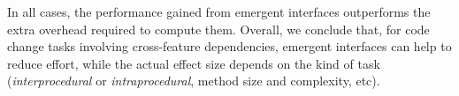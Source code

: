 
In all cases, the performance gained from emergent interfaces outperforms the extra overhead required to compute them. Overall, we conclude that, for code change tasks involving cross-feature dependencies, emergent interfaces can help to reduce effort, while the actual effect size depends on the kind of task (\textit{interprocedural} or \textit{intraprocedural}, method size and complexity, etc).





